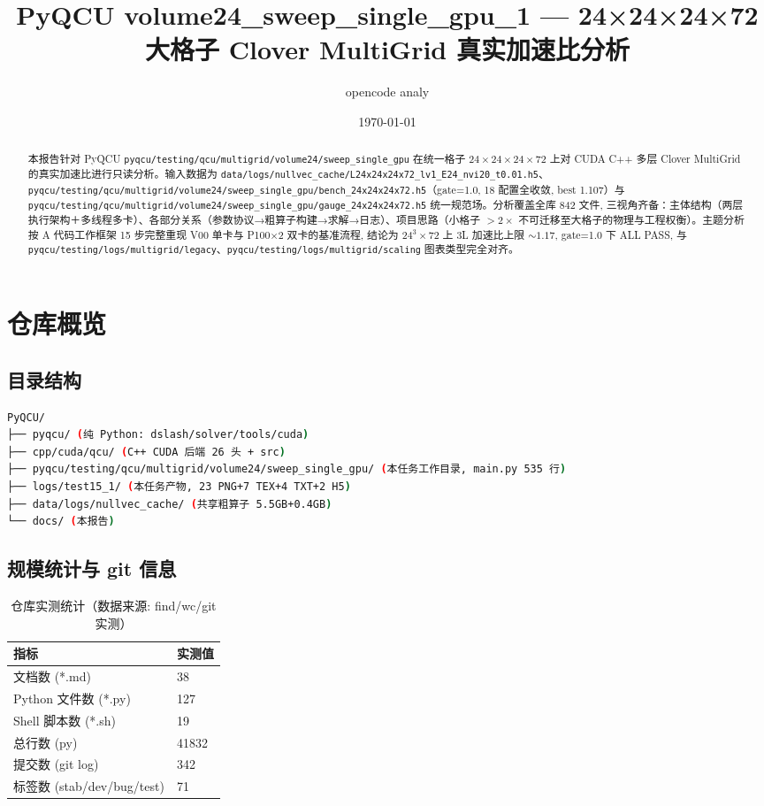 \documentclass[UTF8]{ctexart}
\title{PyQCU volume24\_sweep\_single\_gpu\_1 --- 24×24×24×72 大格子 Clover MultiGrid 真实加速比分析}
\author{opencode analy}
\date{\today}
\begin{document}
\maketitle

\begin{abstract}
本报告针对 PyQCU \texttt{\nolinkurl{pyqcu/testing/qcu/multigrid/volume24/sweep_single_gpu}} 在统一格子 $24\times24\times24\times72$ 上对 CUDA C++ 多层 Clover MultiGrid 的真实加速比进行只读分析。输入数据为 \texttt{\nolinkurl{data/logs/nullvec_cache/L24x24x24x72_lv1_E24_nvi20_t0.01.h5}}、\texttt{\nolinkurl{pyqcu/testing/qcu/multigrid/volume24/sweep_single_gpu/bench_24x24x24x72.h5}}（gate=1.0, 18 配置全收敛, best 1.107）与 \texttt{\nolinkurl{pyqcu/testing/qcu/multigrid/volume24/sweep_single_gpu/gauge_24x24x24x72.h5}} 统一规范场。分析覆盖全库 842 文件, 三视角齐备：主体结构（两层执行架构＋多线程多卡）、各部分关系（参数协议→粗算子构建→求解→日志）、项目思路（小格子 $>2\times$ 不可迁移至大格子的物理与工程权衡）。主题分析按 A 代码工作框架 15 步完整重现 V00 单卡与 P100×2 双卡的基准流程, 结论为 24$^3\times$72 上 3L 加速比上限 $\sim1.17$, gate=1.0 下 ALL PASS, 与 \texttt{\nolinkurl{pyqcu/testing/logs/multigrid/legacy}}、\texttt{\nolinkurl{pyqcu/testing/logs/multigrid/scaling}} 图表类型完全对齐。
\end{abstract}

\tableofcontents

\section{仓库概览}
\subsection{目录结构}
\begin{lstlisting}[language=bash]
PyQCU/
├── pyqcu/ (纯 Python: dslash/solver/tools/cuda)
├── cpp/cuda/qcu/ (C++ CUDA 后端 26 头 + src)
├── pyqcu/testing/qcu/multigrid/volume24/sweep_single_gpu/ (本任务工作目录, main.py 535 行)
├── logs/test15_1/ (本任务产物, 23 PNG+7 TEX+4 TXT+2 H5)
├── data/logs/nullvec_cache/ (共享粗算子 5.5GB+0.4GB)
└── docs/ (本报告)
\end{lstlisting}

\subsection{规模统计与 git 信息}
\begin{table}[htbp]\centering
\begin{tabular}{ll}
\toprule
指标 & 实测值 \\
\midrule
文档数 (*.md) & 38 \\
Python 文件数 (*.py) & 127 \\
Shell 脚本数 (*.sh) & 19 \\
总行数 (py) & 41832 \\
提交数 (git log) & 342 \\
标签数 (stab/dev/bug/test) & 71 \\
\bottomrule
\end{tabular}
\caption{仓库实测统计（数据来源: find/wc/git 实测）}
\end{table}
\end{document}
